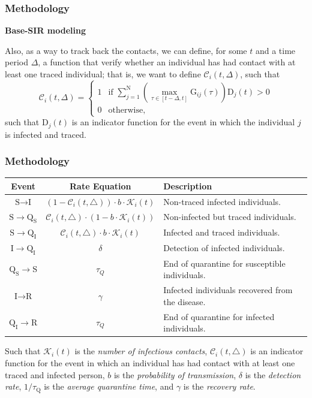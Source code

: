 \documentclass[12pt, aspectratio = 169]{beamer} %
\begin{document}
	\begin{frame}[t]
		\frametitle{Methodology}
		\justifying
		\textcolor{titles}{\textbf{Base-SIR modeling}}
		
		Also, as a way to track back the contacts, we can define, for some $t$ and a time period $\Delta$, a function that verify whether an individual has had contact with at least one traced individual; that is, we want to define $\mathcal{C}_i(t, \Delta)$, such that 
		\[ \mathcal{C}_i(t, \Delta) = 
		\begin{cases} 
			1 & \text{if }\sum_{j = 1}^{\text{N}} \left(\max_{\tau \in [t - \Delta, t]}\text{G}_{ij}(\tau)\right)\text{D}_{j}(t) > 0 \\
			0 & \text{otherwise},
		\end{cases}
		\]
		such that $\text{D}_j(t)$ is an indicator function for the event in which the individual $j$ is infected and traced.
		
	\end{frame}

	\begin{frame}[t]
		\frametitle{Methodology}
		\justifying

		\begin{table}[!ht]
			\centering
			\footnotesize
			\begin{tabular}{c|c|l} 
				\hline
				Event & Rate Equation & Description \\
				\hline
				$\text{S}\rightarrow\text{I}$ & $(1 - \mathcal{C}_i(t, \triangle)) \cdot b \cdot \mathcal{K}_i(t)$ & Non-traced infected individuals. \\
				$\text{S}\rightarrow\text{Q}_{\text{S}}$ &  $\mathcal{C}_i(t, \triangle) \cdot (1 - b \cdot \mathcal{K}_i(t))$ & Non-infected but traced individuals. \\
				$\text{S}\rightarrow\text{Q}_{\text{I}}$ &  $\mathcal{C}_i(t, \triangle) \cdot b \cdot \mathcal{K}_i(t)$ & Infected and traced individuals. \\
				$\text{I}\rightarrow\text{Q}_{\text{I}}$ &  $\delta$ & Detection of infected individuals. \\
				$\text{Q}_{\text{S}}\rightarrow\text{S}$ &  $\tau_Q$ & End of quarantine for susceptible individuals. \\
				$\text{I}\rightarrow\text{R}$ &  $\gamma$ & Infected individuals recovered from the disease. \\
				$\text{Q}_{\text{I}}\rightarrow\text{R}$ & $\tau_Q$ & End of quarantine for infected individuals.
			\end{tabular}%
			\label{table:rate-equations}
		\end{table}
	Such that $\mathcal{K}_i(t)$ is the \textit{number of infectious contacts}, $\mathcal{C}_i(t, \triangle)$ is an indicator function for the event in which an individual has had contact with at least one traced and infected person, $b$ is the \textit{probability of transmission}, $\delta$ is the \textit{detection rate}, $1/\tau_{\text{Q}}$ is the \textit{average quarantine time}, and $\gamma$ is the \textit{recovery rate}.
	\end{frame}
\end{document}
